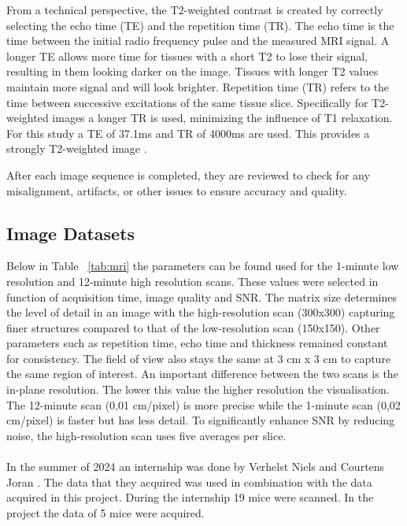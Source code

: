 \documentclass[twocolumn]{article}
\begin{document}
From a technical perspective, the T2-weighted contrast is created by correctly selecting the echo time (TE) and the repetition time (TR). 
The echo time is the time between the initial radio frequency pulse and the measured MRI signal. 
A longer TE allows more time for tissues with a short T2 to lose their signal, resulting in them looking darker on the image. 
Tissues with longer T2 values maintain more signal and will look brighter. Repetition time (TR) refers to the time between successive excitations of the same tissue slice. 
Specifically for T2-weighted images a longer TR is used, minimizing the influence of T1 relaxation. For this study a TE of 37.1ms and TR of 4000ms are used. 
This provides a strongly T2-weighted image \cite{chavhan2009t2star}\cite{mrimaster2024}.  


After each image sequence is completed, they are reviewed to check for any misalignment, artifacts, or other issues to ensure accuracy and quality. 

\subsection{Image Datasets}

Below in Table ~\ref{tab:mri} the parameters can be found used for the 1-minute low resolution and 12-minute high resolution scans. 
These values were selected in function of acquisition time, image quality and SNR. 
The matrix size determines the level of detail in an image with the high-resolution scan (300x300) capturing finer structures compared to that of the low-resolution scan (150x150). 
Other parameters such as repetition time, echo time and thickness remained constant for consistency. The field of view also stays the same at 3 cm x 3 cm to capture the same region of interest. 
An important difference between the two scans is the in-plane resolution. The lower this value the higher resolution the visualisation. 
The 12-minute scan (0,01 cm/pixel) is more precise while the 1-minute scan (0,02 cm/pixel) is faster but has less detail. 
To significantly enhance SNR by reducing noise, the high-resolution scan uses five averages per slice.\\
\\
In the summer of 2024 an internship was done by Verhelst Niels and Courtens Joran \cite{verhelst2025denoising}. 
The data that they acquired was used in combination with the data acquired in this project. During the internship 19 mice were scanned. 
In the project the data of 5 mice were acquired.
 
\end{document}
